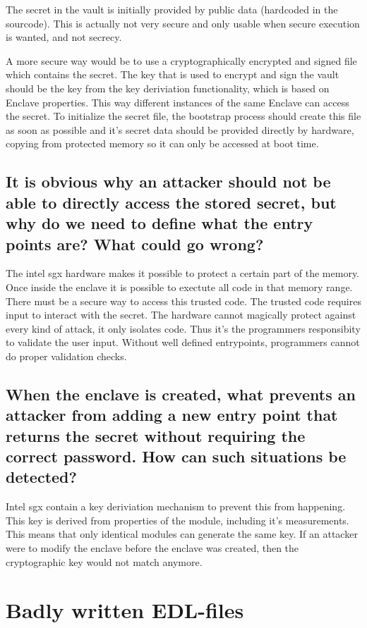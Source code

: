 \documentclass{article}
\begin{document}
The secret in the vault is initially provided by public data (hardcoded in the
sourcode). This is actually
not very secure and only usable when secure execution is wanted, and not
secrecy.

A more secure way would be to use a cryptographically encrypted and signed file
which contains the secret. The key that is used to encrypt and sign the vault
should be the key from the key deriviation functionality, which is based on
Enclave properties. This way different instances of the same Enclave can access
the secret.
To initialize the secret file, the bootstrap process should create this file as soon
as possible and it's secret data should be provided directly by hardware,
copying from protected memory so it can only be accessed at boot time.


\subsection{It is obvious why an attacker should not be able to directly access the
stored secret, but why do we need to define what the entry points are?
What could go wrong?}
The intel sgx hardware makes it possible to protect a certain part of the
memory. Once inside the enclave it is possible to exectute all code in that
memory range. There must be a secure way to access this trusted code. The
trusted code requires input to interact with the secret. The hardware cannot
magically protect against every kind of attack, it only isolates code. Thus it's
the programmers responsibity to validate the user input. Without well defined
entrypoints, programmers cannot do proper validation checks.

\subsection{When the enclave is created, what prevents an attacker from adding a new
entry point that returns the secret
without
requiring the correct password.
How can such situations be detected?}

Intel sgx contain a key deriviation mechanism to prevent this from happening.
This key is derived from properties of the module, including it's measurements.
This means that only identical modules can generate the same key. If an attacker
were to modify the enclave before the enclave was created, then the
cryptographic key would not match anymore.

\section{Badly written EDL-files}
\end{document}

